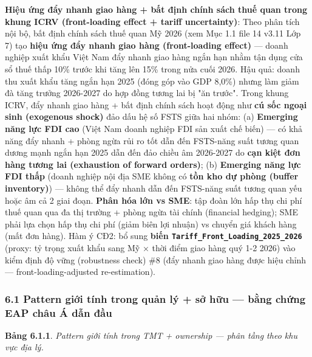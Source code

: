 \documentclass[12pt,a4paper]{article}
\begin{document}
\textbf{Hiệu ứng đẩy nhanh giao hàng + bất định chính sách thuế quan
trong khung ICRV (front-loading effect + tariff uncertainty)}: Theo phân
tích nội bộ, bất định chính sách thuế quan Mỹ 2026 (xem Mục 1.1 file 14
v3.11 Lớp 7) tạo \textbf{hiệu ứng đẩy nhanh giao hàng (front-loading
effect)} --- doanh nghiệp xuất khẩu Việt Nam đẩy nhanh giao hàng ngắn
hạn nhằm tận dụng cửa sổ thuế thấp 10\% trước khi tăng lên 15\% trong
nửa cuối 2026. Hậu quả: doanh thu xuất khẩu tăng ngắn hạn 2025 (đóng góp
vào GDP 8,0\%) nhưng làm giảm đà tăng trưởng 2026-2027 do hợp đồng tương
lai bị "ăn trước". Trong khung ICRV, đẩy nhanh giao hàng + bất định
chính sách hoạt động như \textbf{cú sốc ngoại sinh (exogenous shock)}
đảo dấu hệ số FSTS giữa hai nhóm: (a) \textbf{Emerging năng lực FDI cao}
(Việt Nam doanh nghiệp FDI sản xuất chế biến) --- có khả năng đẩy nhanh
+ phòng ngừa rủi ro tốt dẫn đến FSTS-năng suất tương quan dương mạnh
ngắn hạn 2025 dẫn đến đảo chiều âm 2026-2027 do \textbf{cạn kiệt đơn
hàng tương lai (exhaustion of forward orders)}; (b) \textbf{Emerging
năng lực FDI thấp} (doanh nghiệp nội địa SME không có \textbf{tồn kho dự
phòng (buffer inventory)}) --- không thể đẩy nhanh dẫn đến FSTS-năng
suất tương quan yếu hoặc âm cả 2 giai đoạn. \textbf{Phân hóa lớn vs
SME}: tập đoàn lớn hấp thụ chi phí thuế quan qua đa thị trường + phòng
ngừa tài chính (financial hedging); SME phải lựa chọn hấp thụ chi phí
(giảm biên lợi nhuận) vs chuyển giá khách hàng (mất đơn hàng). Hàm ý
CĐ2: bổ sung \textbf{biến \texttt{Tariff\_Front\_Loading\_2025\_2026}}
(proxy: tỷ trọng xuất khẩu sang Mỹ × thời điểm giao hàng quý 1-2 2026)
vào kiểm định độ vững (robustness check) \#8 (đẩy nhanh giao hàng được
hiệu chỉnh --- front-loading-adjusted re-estimation).

\hypertarget{61-pattern-giux1edbi-tuxednh-trong-quux1ea3n-luxfd--sux1edf-hux1eefu--bux1eb1ng-chux1ee9ng-eap-chuxe2u-uxe1-dux1eabn-ux111ux1ea7u}{%
\subsubsection{6.1 Pattern giới tính trong quản lý + sở hữu --- bằng
chứng EAP châu Á dẫn
đầu}\label{61-pattern-giux1edbi-tuxednh-trong-quux1ea3n-luxfd--sux1edf-hux1eefu--bux1eb1ng-chux1ee9ng-eap-chuxe2u-uxe1-dux1eabn-ux111ux1ea7u}}

\textbf{Bảng 6.1.1}. \emph{Pattern giới tính trong TMT + ownership ---
phân tầng theo khu vực địa lý.}
\end{document}
